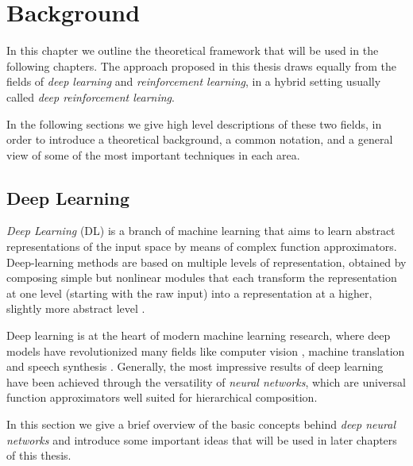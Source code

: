 \chapter{Background}
\label{chapter2_background}
\thispagestyle{empty}

\vspace{0.5cm}

In this chapter we outline the theoretical framework that will be 
used in the following chapters. The approach proposed in this thesis draws 
equally from the fields of \textit{deep learning} and 
\textit{reinforcement learning}, in a hybrid setting usually called 
\textit{deep reinforcement learning}.

In the following sections we give high level descriptions of these two fields, 
in order to introduce a theoretical background, a common notation, and a general
view of some of the most important techniques in each area. 

\section{Deep Learning} \label{s:DL}
\textit{Deep Learning} (DL) is a branch of machine learning that aims to learn
abstract representations of the input space by means of complex function 
approximators.  Deep-learning methods are based on multiple levels of 
representation, obtained by composing simple but nonlinear modules that each 
transform the representation at one level (starting with the raw input) into a 
representation at a higher, slightly more abstract level \cite{lecun2015deep}.

Deep learning is at the heart of modern machine learning research, where deep 
models have revolutionized many fields like computer vision 
\cite{krizhevsky2012imagenet, szegedy2015going}, machine translation 
\cite{wu2016google} and speech synthesis \cite{vanwavenet}.
Generally, the most impressive results of deep learning have been achieved 
through the versatility of \textit{neural networks}, which are universal 
function approximators well suited for hierarchical composition.

In this section we give a brief overview of the basic concepts behind 
\textit{deep neural networks }and introduce some important ideas that will be 
used in later chapters of this thesis.

